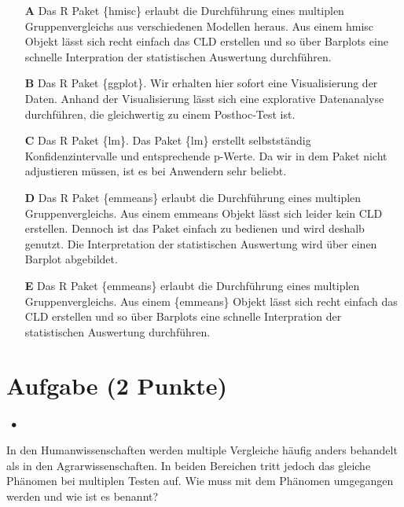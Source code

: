 \documentclass[a4paper, 9pt]{scrartcl}\usepackage[]{graphicx}\usepackage[]{xcolor}
\begin{document}
\begin{enumerate}
\item [\textbf{A} \msquare] Das R Paket \{hmisc\} erlaubt die Durchführung eines multiplen Gruppenvergleichs aus verschiedenen Modellen heraus. Aus einem hmisc Objekt lässt sich recht einfach das CLD erstellen und so über Barplots eine schnelle Interpration der statistischen Auswertung durchführen.
\item [\textbf{B} \msquare] Das R Paket \{ggplot\}. Wir erhalten hier sofort eine Visualisierung der Daten. Anhand der Visualisierung lässt sich eine explorative Datenanalyse durchführen, die gleichwertig zu einem Posthoc-Test ist.
\item [\textbf{C} \msquare] Das R Paket \{lm\}. Das Paket \{lm\} erstellt selbstständig Konfidenzintervalle und entsprechende p-Werte. Da wir in dem Paket nicht adjustieren müssen, ist es bei Anwendern sehr beliebt.
\item [\textbf{D} \msquare] Das R Paket \{emmeans\} erlaubt die Durchführung eines multiplen Gruppenvergleichs. Aus einem emmeans Objekt lässt sich leider kein CLD erstellen. Dennoch ist das Paket einfach zu bedienen und wird deshalb genutzt. Die Interpretation der statistischen Auswertung wird über einen Barplot abgebildet.
\item [\textbf{E} \msquare] Das R Paket \{emmeans\} erlaubt die Durchführung eines multiplen Gruppenvergleichs. Aus einem \{emmeans\} Objekt lässt sich recht einfach das CLD erstellen und so über Barplots eine schnelle Interpration der statistischen Auswertung durchführen.
\end{enumerate}

\section{Aufgabe \hfill (2 Punkte)}

\ifcollection
\begin{flushright}
\tiny\vspace{-2Ex}
\textbf{\examinhaltstart}
\exammodulestatversuch $\;\bullet$
\exammodulebiostat
\vspace{-1Ex}
\end{flushright}
\fi




In den Humanwissenschaften werden multiple Vergleiche häufig anders behandelt als in den Agrarwissenschaften. In beiden Bereichen tritt jedoch das gleiche Phänomen bei multiplen Testen auf. Wie muss mit dem Phänomen umgegangen werden und wie ist es benannt?
\end{document}
